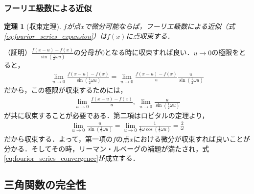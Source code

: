 \documentclass[dvipdfmx,graphicx,14pt]{beamer}
\newtheorem{mytheorem}{定理}
\begin{document}
\begin{frame}[c]
    \frametitle{フーリエ級数による近似}
    \begin{mytheorem}[収束定理]
        $f$が点$x$で微分可能ならば，フーリエ級数による近似（式\eqref{eq:fourior_series_expansion}）は$f(x)$に点収束する．
    \end{mytheorem}
    \scriptsize
    （証明）$\frac{f(x-u) - f(x)}{\sin\left(\frac{1}{2}\omega u\right)}$の分母が$0$となる時に収束すれば良い．$u\to0$の極限をとると，
    \begin{align*}
        \lim_{u\to 0} \frac{f(x-u) - f(x)}{\sin\left(\frac{1}{2}\omega u\right)} = \lim_{u\to 0} \frac{f(x-u) - f(x)}{u} \frac{u}{\sin\left(\frac{1}{2}\omega u\right)}
    \end{align*}
    だから，この極限が収束するためには，
    \begin{align*}
        \lim_{u\to 0} \frac{f(x-u) - f(x)}{u},\ \lim_{u\to 0} \frac{u}{\sin\left(\frac{1}{2}\omega u\right)}
    \end{align*}
    が共に収束することが必要である．第二項はロピタルの定理より，
    \begin{align*}
        \lim_{u\to 0} \frac{u}{\sin\left(\frac{1}{2}\omega u\right)} = \lim_{u\to 0} \frac{1}{\frac{1}{2}\omega \cos\left(\frac{1}{2}\omega u\right)} = \frac{2}{\omega}
    \end{align*}
    だから収束する．よって，第一項の$f$の点$x$における微分が収束すれば良いことが分かる．そしてその時，リーマン・ルベーグの補題が満たされ，式\eqref{eq:fourior_series_convergence}が成立する．
\end{frame}

\subsection{三角関数の完全性}
\end{document}
